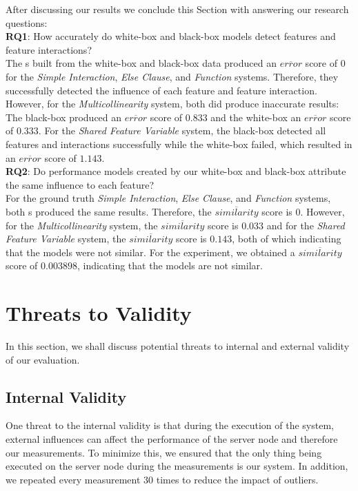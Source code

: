 After discussing our results we conclude this Section with answering our research questions: \\

\noindent \textbf{RQ1}: How accurately do white-box and black-box models detect features and feature interactions? \\

\noindent The {\perfInfluenceModel}s built from the white-box and black-box data produced an $\overline{error}$ score of $0$ 
for the \emph{Simple Interaction}, \emph{Else Clause}, and \emph{Function} systems. Therefore, they successfully
detected the influence of each feature and feature interaction. 
However, for the \emph{Multicollinearity} system, both did produce inaccurate results: 
The black-box produced an $\overline{error}$ score of $0.833$ and the white-box an $\overline{error}$ score of $0.333$. 
For the \emph{Shared Feature Variable} system, the black-box detected all features and interactions successfully
while the white-box failed, which resulted in an $\overline{error}$ score of $1.143$.
\\

\noindent \textbf{RQ2}: Do performance models created by our white-box and black-box attribute the same influence to each feature?\\

\noindent For the ground truth \emph{Simple Interaction}, \emph{Else Clause}, and \emph{Function} systems, 
both {\perfInfluenceModel}s produced the same results. Therefore, the $\overline{similarity}$ score is $0$.
However, for the \emph{Multicollinearity} system, the $\overline{similarity}$ score is $0.033$ and for the \emph{Shared Feature Variable} system,
the $\overline{similarity}$ score is $0.143$, both of which indicating that the models were not similar.
For the experiment, we obtained a $\overline{similarity}$ score of $0.003898$, indicating that the models are not similar.

\section{Threats to Validity}\label{sec:threats}

In this section, we shall discuss potential threats to internal and external validity of our evaluation.

\subsection*{Internal Validity}
One threat to the internal validity is that during the execution of the system, 
external influences can affect the performance of the server node and therefore our measurements. 
To minimize this, we ensured that the only thing being executed on the server node during the measurements is our system. 
In addition, we repeated every measurement $30$ times to reduce the impact of outliers.  

